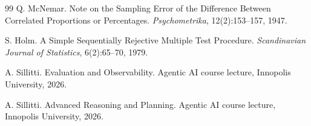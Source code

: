 \documentclass[11pt,a4paper]{article}
\begin{document}
\begin{thebibliography}{99}
Q. McNemar.
\newblock Note on the Sampling Error of the Difference Between Correlated
Proportions or Percentages.
\newblock \emph{Psychometrika}, 12(2):153--157, 1947.

S. Holm.
\newblock A Simple Sequentially Rejective Multiple Test Procedure.
\newblock \emph{Scandinavian Journal of Statistics}, 6(2):65--70, 1979.

A. Sillitti.
\newblock Evaluation and Observability.
\newblock Agentic AI course lecture, Innopolis University, 2026.

A. Sillitti.
\newblock Advanced Reasoning and Planning.
\newblock Agentic AI course lecture, Innopolis University, 2026.

\end{thebibliography}
\end{document}
